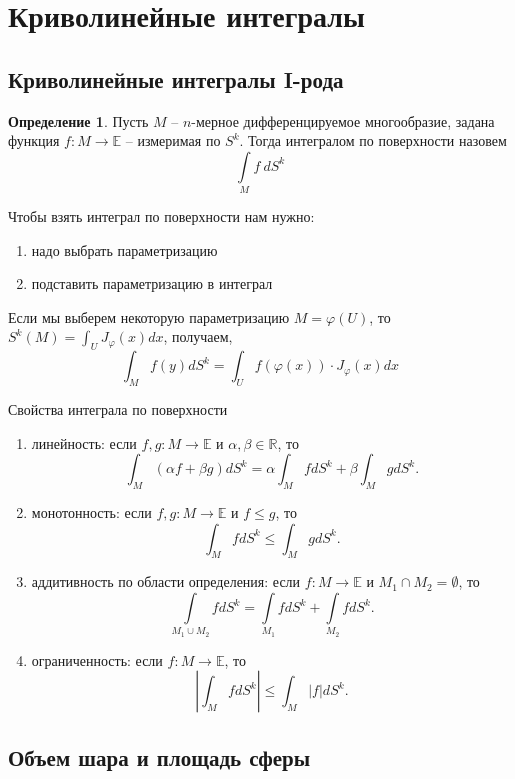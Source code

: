 \documentclass[a5paper]{article}
\newcounter{through}
\theoremstyle{plain}
\theoremstyle{definition}
\newtheorem{definition}[through]{Определение}
\numberwithin{through}{section}
\numberwithin{equation}{section}
\begin{document}
\section{Криволинейные интегралы}
\subsection{Криволинейные интегралы I-рода}

\begin{definition}
	Пусть $M$ -- $n$-мерное дифференцируемое многообразие, задана функция
	$f: M \to \mathbb{E}$ -- измеримая по $S^k$. Тогда интегралом по поверхности назовем 
	\[ \int\limits_M f\ dS^k \]
\end{definition}

Чтобы взять интеграл по поверхности нам нужно: 
\begin{enumerate}
	\item 
	надо выбрать параметризацию
	
	\item 
	подставить параметризацию в интеграл
\end{enumerate}

Если мы выберем некоторую параметризацию $M = \varphi(U)$, то $S^k(M) = \int_U J_{\varphi}(x)dx$, получаем,
 \[ \int_M f(y)dS^k = \int_U f(\varphi(x))\cdot J_\varphi (x)dx \]
 
 
 Свойства интеграла по поверхности
 \begin{enumerate}
 	\item 
 	линейность: если $f, g: M \to \mathbb{E}$ и $\alpha, \beta \in \mathbb{R}$, то 
 	\[ \int_M (\alpha f + \beta g) dS^k = \alpha \int_M f dS^k + 
 	\beta\int_M g dS^k. \]
 	
 	\item 
 	монотонность: если $f, g: M \to \mathbb{E}$ и $f \leq g$, то
 	\[ \int_M f dS^k \leq \int_M g dS^k. \]
 	
 	\item
 	аддитивность по области определения: если $f: M \to \mathbb{E}$ 
 	и $M_1 \cap M_2 = \emptyset$, то 
 	\[ \underset{M_1 \cup M_2}{\int} f dS^k = 
 	\underset{M_1}{\int} f dS^k +\underset{M_2}{\int}  f dS^k. \]
 	
 	\item 
 	ограниченность: если $f: M \to \mathbb{E}$, то
 	\[ \left| \int_M f dS^k \right| \leq \int_M |f| dS^k.  \]
 	
 \end{enumerate}

\subsection{Объем шара и площадь сферы} %
\end{document}
